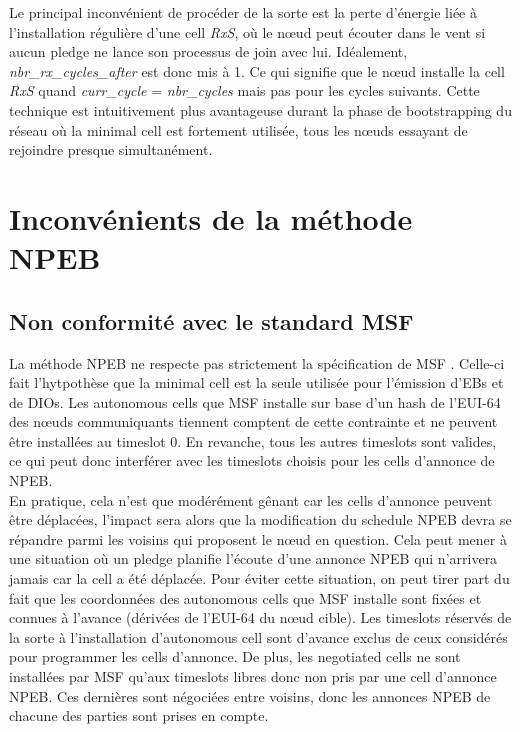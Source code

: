 \documentclass[]{report}
\begin{document}
Le principal inconvénient de procéder de la sorte est la perte d'énergie liée à l'installation régulière d'une cell \textit{RxS}, où le nœud peut écouter dans le vent si aucun pledge ne lance son processus de join avec lui. Idéalement, \textit{nbr\_rx\_cycles\_after} est donc mis à 1. Ce qui signifie que le nœud installe la cell \textit{RxS} quand \textit{curr\_cycle} = \textit{nbr\_cycles} mais pas pour les cycles suivants. Cette technique est intuitivement plus avantageuse durant la phase de bootstrapping du réseau où la minimal cell est fortement utilisée, tous les nœuds essayant de rejoindre presque simultanément.

\newpage

\section{Inconvénients de la méthode NPEB}

\subsection{Non conformité avec le standard MSF}

La méthode NPEB ne respecte pas strictement la spécification de MSF \cite{ietf-6tisch-msf-10}. Celle-ci fait l'hytpothèse que la minimal cell est la seule utilisée pour l'émission d'EBs et de DIOs. Les autonomous cells que MSF installe sur base d'un hash de l'EUI-64 des nœuds communiquants tiennent comptent de cette contrainte et ne peuvent être installées au timeslot 0. En revanche, tous les autres timeslots sont valides, ce qui peut donc interférer avec les timeslots choisis pour les cells d'annonce de NPEB.\\

En pratique, cela n'est que modérément gênant car les cells d'annonce peuvent être déplacées, l'impact sera alors que la modification du schedule NPEB devra se répandre parmi les voisins qui proposent le nœud en question. Cela peut mener à une situation où un pledge planifie l'écoute d'une annonce NPEB qui n'arrivera jamais car la cell a été déplacée. Pour éviter cette situation, on peut tirer part du fait que les coordonnées des autonomous cells que MSF installe sont fixées et connues à l'avance (dérivées de l'EUI-64 du nœud cible). Les timeslots réservés de la sorte à l'installation d'autonomous cell sont d'avance exclus de ceux considérés pour programmer les cells d'annonce. De plus, les negotiated cells ne sont installées par MSF qu'aux timeslots libres donc non pris par une cell d'annonce NPEB. Ces dernières sont négociées entre voisins, donc les annonces NPEB de chacune des parties sont prises en compte.
\end{document}
